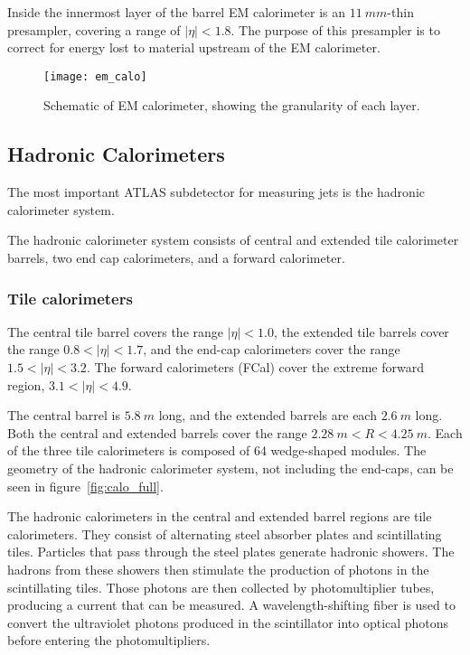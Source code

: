 Inside the innermost layer of the barrel EM calorimeter is an $11~mm$-thin presampler, covering a range of $|\eta| < 1.8$.
The purpose of this presampler is to correct for energy lost to material upstream of the EM calorimeter.

\begin{figure}[h]
\texttt{[image: em\_calo]}
\caption{Schematic of EM calorimeter, showing the granularity of each layer.}
\label{fig:em_calo}\cite{em-calo}
\end{figure}

\subsection{Hadronic Calorimeters}\label{subsec:had_cal}

The most important ATLAS subdetector for measuring jets is the hadronic calorimeter system.

The hadronic calorimeter system consists of central and extended tile calorimeter barrels, two end cap calorimeters,
and a forward calorimeter.

\subsubsection{Tile calorimeters}

The central tile barrel covers the range $|\eta|<1.0$, the extended tile barrels cover the range $0.8 < |\eta| < 1.7$,
and the end-cap calorimeters cover the range $1.5 < |\eta| < 3.2$.
The forward calorimeters (FCal) cover the extreme forward region, $3.1 < |\eta| < 4.9$.

The central barrel is $5.8~m$ long, and the extended barrels are each $2.6~m$ long.
Both the central and extended barrels cover the range $2.28~m < R < 4.25~m$.
Each of the three tile calorimeters is composed of 64 wedge-shaped modules.
The geometry of the hadronic calorimeter system, not including the end-caps, can be seen in figure~\ref{fig:calo_full}.

The hadronic calorimeters in the central and extended barrel regions are tile calorimeters.
They consist of alternating steel absorber plates and scintillating tiles.
Particles that pass through the steel plates generate hadronic showers.
The hadrons from these showers then stimulate the production of photons in the scintillating tiles.
Those photons are then collected by photomultiplier tubes, producing a current that can be measured.
A wavelength-shifting fiber is used to convert the ultraviolet photons produced in the scintillator into optical photons
before entering the photomultipliers.

